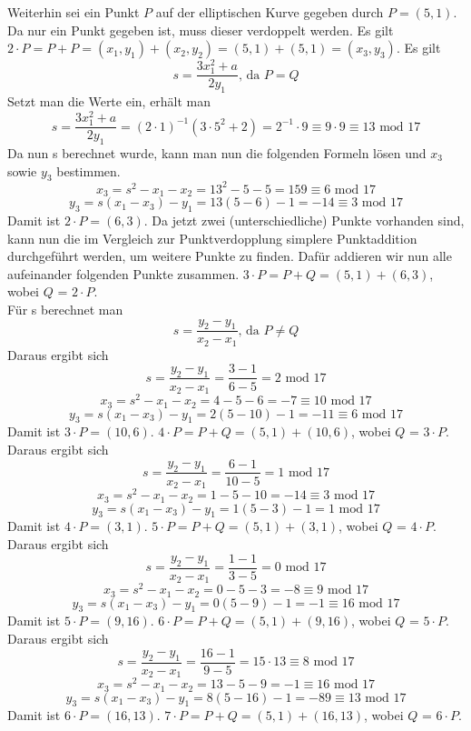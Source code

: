 Weiterhin sei ein Punkt $P$ auf der elliptischen Kurve gegeben durch $P = (5, 1)$. Da nur ein Punkt gegeben ist, muss dieser verdoppelt werden. Es gilt $2 \cdot P = P + P = (x_1, y_1) + (x_2, y_2) = (5, 1) + (5, 1) = (x_3, y_3)$. Es gilt
$$s = \frac{3x_1^2 + a}{2y_1} \text{, da } P = Q $$
Setzt man die Werte ein, erhält man 
$$s = \frac{3x_1^2 + a}{2y_1} = (2 \cdot 1)^{-1}(3 \cdot 5^2 + 2) = 2^{-1} \cdot 9 \equiv 9 \cdot 9 \equiv 13 \text{ mod } 17$$
Da nun s berechnet wurde, kann man nun die folgenden Formeln lösen und $x_3$ sowie $y_3$ bestimmen.
$$x_3 = s^2 - x_1 - x_2 = 13^2 - 5 - 5 = 159 \equiv 6 \text{ mod } 17$$
$$y_3 = s(x_1 - x_3) - y_1 = 13(5 - 6) - 1 = - 14 \equiv 3 \text{ mod } 17$$
Damit ist $2 \cdot P = (6, 3)$. Da jetzt zwei (unterschiedliche) Punkte vorhanden sind, kann nun die im Vergleich zur Punktverdopplung simplere Punktaddition durchgeführt werden, um weitere Punkte zu finden. Dafür addieren wir nun alle aufeinander folgenden Punkte zusammen. $3 \cdot P = P + Q = (5, 1) + (6, 3)$, wobei $Q$ = $2 \cdot P$.\\
Für s berechnet man
$$s = \frac{y_2 - y_1}{x_2 - x_1} \text{, da } P \neq Q $$
Daraus ergibt sich 
$$s = \frac{y_2 - y_1}{x_2 -x_1} = \frac{3 - 1}{6 - 5} = 2 \text{ mod } 17$$
$$x_3 = s^2 - x_1 - x_2 = 4 - 5 - 6 = - 7 \equiv 10 \text{ mod } 17$$
$$y_3 = s(x_1 - x_3) - y_1 = 2(5 - 10) - 1 = - 11 \equiv 6 \text{ mod } 17$$
Damit ist $3 \cdot P = (10, 6)$. $4 \cdot P = P + Q = (5, 1) + (10, 6)$, wobei $Q$ = $3 \cdot P$. 
Daraus ergibt sich 
$$s = \frac{y_2 - y_1}{x_2 -x_1} = \frac{6 - 1}{10 - 5} = 1 \text{ mod } 17$$
$$x_3 = s^2 - x_1 - x_2 = 1 - 5 - 10 = -14 \equiv 3 \text{ mod } 17$$
$$y_3 = s(x_1 - x_3) - y_1 = 1(5 - 3) - 1 = 1 \text{ mod } 17$$
Damit ist $4 \cdot P = (3, 1)$. $5 \cdot P = P + Q = (5, 1) + (3, 1)$, wobei $Q$ = $4 \cdot P$.\\
Daraus ergibt sich 
$$s = \frac{y_2 - y_1}{x_2 -x_1} = \frac{1 - 1}{3 - 5} = 0 \text{ mod } 17$$
$$x_3 = s^2 - x_1 - x_2 = 0 - 5 - 3 = - 8 \equiv 9 \text{ mod } 17$$
$$y_3 = s(x_1 - x_3) - y_1 = 0(5 - 9) - 1 = - 1 \equiv 16 \text{ mod } 17$$
Damit ist $5 \cdot P = (9, 16)$. $6 \cdot P = P + Q = (5, 1) + (9, 16)$, wobei $Q$ = $5 \cdot P$.\\
Daraus ergibt sich 
$$s = \frac{y_2 - y_1}{x_2 -x_1} = \frac{16 - 1}{9 - 5} = 15 \cdot 13 \equiv 8 \text{ mod } 17$$
$$x_3 = s^2 - x_1 - x_2 = 13 - 5 - 9 = -1 \equiv 16 \text{ mod } 17$$
$$y_3 = s(x_1 - x_3) - y_1 = 8(5 - 16) - 1 = - 89 \equiv 13 \text{ mod } 17$$
Damit ist $6 \cdot P = (16, 13)$. $7 \cdot P = P + Q = (5, 1) + (16, 13)$, wobei $Q$ = $6 \cdot P$.\\
